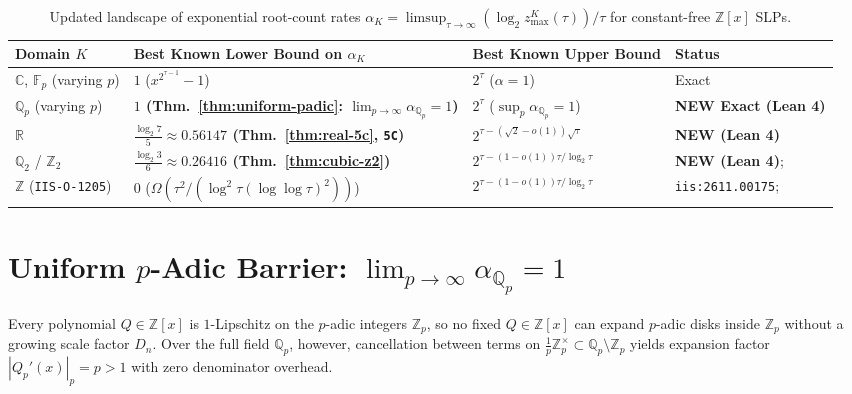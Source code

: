 \documentclass[11pt]{article}
\newcommand{\Z}{\mathbb{Z}}
\newcommand{\Q}{\mathbb{Q}}
\newcommand{\R}{\mathbb{R}}
\newcommand{\C}{\mathbb{C}}
\newcommand{\F}{\mathbb{F}}
\newcommand{\code}[1]{\texttt{#1}}
\newcommand{\zmax}{z_{\max}}
\begin{document}
\begin{table}[h]
\centering
\footnotesize
\begin{tabularx}{\textwidth}{lXXX}
\toprule
Domain $K$ & Best Known Lower Bound on $\alpha_K$ & Best Known Upper Bound & Status \\
\midrule
$\C$, $\F_p$ (varying $p$) & $1$ ($x^{2^{\tau-1}} - 1$) & $2^\tau$ ($\alpha = 1$) & Exact \\
$\Q_p$ (varying $p$) & \textbf{$1$ (Thm.~\ref{thm:uniform-padic}: $\lim_{p \to \infty} \alpha_{\Q_p} = 1$)} & $2^\tau$ ($\sup_p \alpha_{\Q_p} = 1$) & \textbf{NEW Exact (Lean 4)} \\
$\R$ & \textbf{$\frac{\log_2 7}{5} \approx 0.56147$ (Thm.~\ref{thm:real-5c}, \code{5C})} & $2^{\tau - (\sqrt{2}-o(1))\sqrt{\tau}}$ & \textbf{NEW (Lean 4)} \\
$\Q_2$ / $\Z_2$ & \textbf{$\frac{\log_2 3}{6} \approx 0.26416$ (Thm.~\ref{thm:cubic-z2})} & $2^{\tau - (1-o(1))\tau/\log_2\tau}$ & \textbf{NEW (Lean 4)};~\cite{Rojas2002,Rojas2003} \\
$\Z$ (\code{IIS-O-1205}) & $0$ ($\Omega(\tau^2/(\log^2\tau(\log\log\tau)^2))$) & $2^{\tau - (1-o(1))\tau/\log_2\tau}$ & \code{iis:2611.00175};~\cite{Rojas2002,Rojas2003} \\
\bottomrule
\end{tabularx}
\caption{Updated landscape of exponential root-count rates $\alpha_K = \limsup_{\tau \to \infty} (\log_2 \zmax^K(\tau))/\tau$ for constant-free $\Z[x]$ SLPs.}
\label{tab:landscape}
\end{table}

\section{Uniform $p$-Adic Barrier: $\lim_{p \to \infty} \alpha_{\Q_p} = 1$}

Every polynomial $Q \in \Z[x]$ is $1$-Lipschitz on the $p$-adic integers $\Z_p$, so no fixed $Q \in \Z[x]$ can expand $p$-adic disks inside $\Z_p$ without a growing scale factor $D_n$. Over the full field $\Q_p$, however, cancellation between terms on $\frac{1}{p}\Z_p^\times \subset \Q_p \setminus \Z_p$ yields expansion factor $|Q_p'(x)|_p = p > 1$ with zero denominator overhead.
\end{document}
